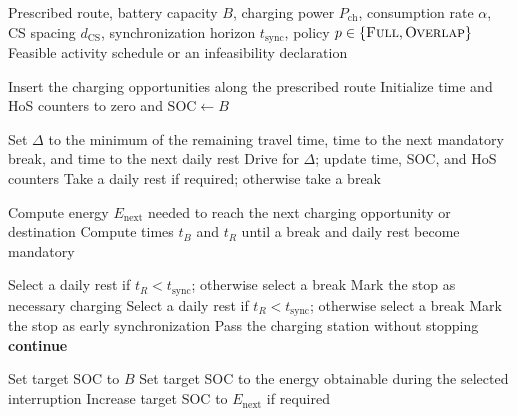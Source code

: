 \documentclass[3p,11pt,authoryear]{elsarticle}  %
\begin{document}
\begin{algorithm}[!htbp]
\caption{Driver-inspired sequential heuristic}
\label{alg:driver_heuristic}
\begin{algorithmic}[1]
\Require Prescribed route, battery capacity \(B\), charging power \(P_{\mathrm{ch}}\),
         consumption rate \(\alpha\), CS spacing \(d_{\mathrm{CS}}\),
         synchronization horizon \(t_{\mathrm{sync}}\), policy
         \(p\in\{\textsc{Full},\textsc{Overlap}\}\)
\Ensure Feasible activity schedule or an infeasibility declaration

\State Insert the charging opportunities along the prescribed route
\State Initialize time and HoS counters to zero and \(\mathrm{SOC}\gets B\)

        \State Set \(\Delta\) to the minimum of the remaining travel time,
               time to the next mandatory break, and time to the next daily rest
        \State Drive for \(\Delta\); update time, SOC, and HoS counters
            \State Take a daily rest if required; otherwise take a break
        \EndIf
    \EndWhile

        \State Compute energy \(E_{\mathrm{next}}\) needed to reach the next
               charging opportunity or destination
        \State Compute times \(t_B\) and \(t_R\) until a break and daily rest
               become mandatory

            \State Select a daily rest if \(t_R<t_{\mathrm{sync}}\);
                   otherwise select a break
            \State Mark the stop as necessary charging
            \State Select a daily rest if \(t_R<t_{\mathrm{sync}}\);
                   otherwise select a break
            \State Mark the stop as early synchronization
        \Else
            \State Pass the charging station without stopping
            \State \textbf{continue}
        \EndIf

            \State Set target SOC to \(B\)
        \Else
            \State Set target SOC to the energy obtainable during the selected
                   interruption
            \State Increase target SOC to \(E_{\mathrm{next}}\) if required
        \EndIf


\end{algorithmic}
\end{algorithm}
\end{document}
